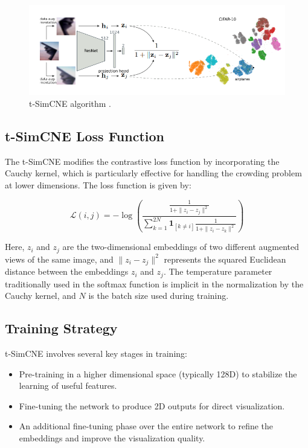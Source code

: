 \begin{figure}[hbt]
\centering
\includegraphics[width=\textwidth]{figs/tsimcne_architecture.png}
\caption{
t-SimCNE algorithm \cite{tsimcne}.
}
\label{fig:secex}
\end{figure}

\subsection{t-SimCNE Loss Function}
The t-SimCNE modifies the contrastive loss function by incorporating the Cauchy kernel, which is particularly effective for handling the crowding problem at lower dimensions. The loss function is given by:

\begin{equation}
\mathcal{L}(i, j) = -\log \left(\frac{\frac{1}{1 + \|z_i - z_j\|^2}}{\sum_{k=1}^{2N} \mathbf{1}_{[k \neq i]} \frac{1}{1 + \|z_i - z_k\|^2}}\right)
\end{equation}

Here, $z_i$ and $z_j$ are the two-dimensional embeddings of two different augmented views of the same image, and $\|z_i - z_j\|^2$ represents the squared Euclidean distance between the embeddings $z_i$ and $z_j$. The temperature parameter traditionally used in the softmax function is implicit in the normalization by the Cauchy kernel, and $N$ is the batch size used during training.


\subsection{Training Strategy}
t-SimCNE involves several key stages in training:
\begin{itemize}
    \item Pre-training in a higher dimensional space (typically 128D) to stabilize the learning of useful features.
    \item Fine-tuning the network to produce 2D outputs for direct visualization.
    \item An additional fine-tuning phase over the entire network to refine the embeddings and improve the visualization quality.
\end{itemize}


